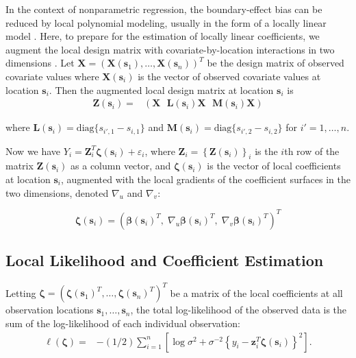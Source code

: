 \documentclass[authoryear,review, 12pt]{elsarticle}
\begin{document}
In the context of nonparametric regression, the boundary-effect bias
can be reduced by local polynomial modeling, usually in the form of
a locally linear model \citep{Fan-Gijbels-1996}. Here, to prepare
for the estimation of locally linear coefficients, we augment the
local design matrix with covariate-by-location interactions in two
dimensions \citep{Wang-2008b}. Let $\bm{X}=\left(\bm{X}\left(\bm{s}_{1}\right),\dots,\bm{X}\left(\bm{s}_{n}\right)\right)^{T}$
be the design matrix of observed covariate values where $\bm{X}\left(\bm{s}_{i}\right)$
is the vector of observed covariate values at location $\bm{s}_{i}$.
Then the augmented local design matrix at location $\bm{s}_{i}$ is
\begin{align}
\bm{Z}(\bm{s}_{i})= & \left(\bm{X}\ \:\:\bm{L}\left(\bm{s}_{i}\right)\bm{X}\ \:\:\bm{M}\left(\bm{s}_{i}\right)\bm{X}\right)\label{eq:augmented-covariates}
\end{align}


where $\bm{L}\left(\bm{s}_{i}\right)=\text{diag}\{s_{i',1}-s_{i,1}\}$
and $\bm{M}\left(\bm{s}_{i}\right)=\text{diag}\{s_{i',2}-s_{i,2}\}$
for $i'=1,\dots,n$.

Now we have $Y_{i}=\bm{Z}_{i}^{T}\bm{\zeta}(\bm{s}_{i})+\varepsilon_{i}$,
where $\bm{Z}_{i}=\left\{ \bm{Z}(\bm{s}_{i})\right\} _{i}$ is the
$i$th row of the matrix $\bm{Z}(\bm{s}_{i})$ as a column vector,
and $\bm{\zeta}(\bm{s}_{i})$ is the vector of local coefficients
at location $\bm{s}_{i}$, augmented with the local gradients of the
coefficient surfaces in the two dimensions, denoted $\nabla_{u}$
and $\nabla_{v}$:

\begin{equation}
\bm{\zeta}(\bm{s}_{i})=\left(\bm{\beta}(\bm{s}_{i})^{T},\;\nabla_{u}\bm{\beta}(\bm{s}_{i})^{T},\;\nabla_{v}\bm{\beta}(\bm{s}_{i})^{T}\right)^{T}\label{eq:augmented-coefficients}
\end{equation}



\subsection{Local Likelihood and Coefficient Estimation}

Letting $\bm{\zeta}=\left(\bm{\zeta}\left(\bm{s}_{1}\right)^{T},\dots,\bm{\zeta}\left(\bm{s}_{n}\right)^{T}\right)^{T}$
be a matrix of the local coefficients at all observation locations
$\bm{s}_{1},\dots,\bm{s}_{n}$, the total log-likelihood of the observed
data is the sum of the log-likelihood of each individual observation:
\begin{align}
\ell\left(\bm{\zeta}\right)= & -(1/2)\sum_{i=1}^{n}\left[\log{\sigma^{2}}+\sigma^{-2}\left\{ y_{i}-\bm{z}_{i}^{T}\bm{\zeta}(\bm{s}_{i})\right\} ^{2}\right].\label{eq:coefficients}
\end{align}
\end{document}
